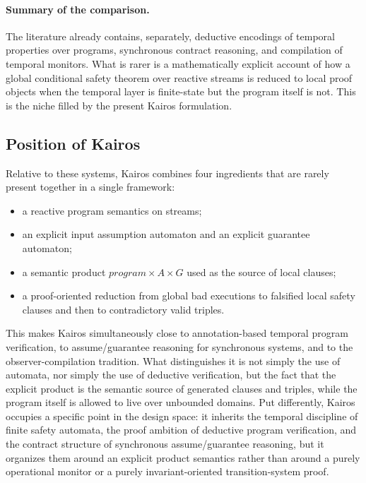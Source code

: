 \documentclass[11pt,a4paper]{article}
\begin{document}
\paragraph{Summary of the comparison.}
The literature already contains, separately, deductive encodings of temporal
properties over programs, synchronous contract reasoning, and compilation of
temporal monitors. What is rarer is a mathematically explicit account of how a
global conditional safety theorem over reactive streams is reduced to local
proof objects when the temporal layer is finite-state but the program itself is
not. This is the niche filled by the present Kairos formulation.

\subsection{Position of Kairos}

Relative to these systems, Kairos combines four ingredients that are rarely
present together in a single framework:
\begin{itemize}[leftmargin=1.4em]
\item a reactive program semantics on streams;
\item an explicit input assumption automaton and an explicit guarantee
  automaton;
\item a semantic product \(program \times A \times G\) used as the source of
  local clauses;
\item a proof-oriented reduction from global bad executions to falsified local
  safety clauses and then to contradictory valid triples.
\end{itemize}
This makes Kairos simultaneously close to annotation-based temporal program
verification, to assume/guarantee reasoning for synchronous systems, and to the
observer-compilation tradition. What distinguishes it is not simply the use of
automata, nor simply the use of deductive verification, but the fact that the
explicit product is the semantic source of generated clauses and triples, while
the program itself is allowed to live over unbounded domains. Put differently,
Kairos occupies a specific point in the design space: it inherits the temporal
discipline of finite safety automata, the proof ambition of deductive program
verification, and the contract structure of synchronous assume/guarantee
reasoning, but it organizes them around an explicit product semantics rather
than around a purely operational monitor or a purely invariant-oriented
transition-system proof.
\end{document}
